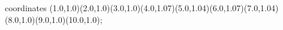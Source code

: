 					coordinates { (1.0,1.0)(2.0,1.0)(3.0,1.0)(4.0,1.07)(5.0,1.04)(6.0,1.07)(7.0,1.04)(8.0,1.0)(9.0,1.0)(10.0,1.0)};